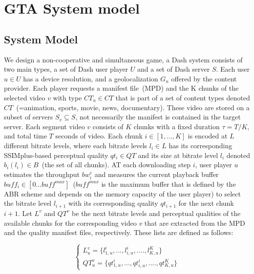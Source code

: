 \section{GTA System model}
\label{sec:gta-dash-model}

\subsection{System Model}

We design a non-cooperative and simultaneous game, a Dash system consists of two main types, a set of Dash user player $U$ and a set of Dash server $S$. Each user $u \in U$ has a device resolution, and a geolocalization $G_{u}$ offered by the content provider. Each player requests a manifest file~(MPD) and the K chunks of the selected video $v$ with type $CT_{u} \in CT$ that is part of a set of content types denoted $CT$~(={animation, sports, movie, news, documentary}). These video are stored on a subset of servers $S_{v} \subseteq S$, not necessarily the manifest is contained in the target server. Each segment video $v$ consists of $K$  chunks with a fixed duration  $\tau = T/K$, and total time $T$ seconds of video. Each chunk $i \in [1,...,K]$ is encoded at $L$ different bitrate levels, where each bitrate levels $l_{i} \in L$ has its corresponding SSIMplus-based perceptual quality $qt_{i} \in QT$ and its size at bitrate level $l_{i}$ denoted $b_{i}(l_{i}) \in B$~(the set of all chunks). AT each downloading step $i$, user player $u$ estimates the throughput $bw_{i}^{e}$ and measures the current playback buffer $buff_{i} \in [0...buff^{max}]$~($buff^{max}$ is the maximum buffer that is defined by the ABR scheme and depends on the memory capacity of the user player) to select the bitrate level $l_{i+1}$  with its corresponding quality $qt_{i+1}$ for the next chunk $i+1$. Let $L^{v}$ and $QT^{v}$  be the next bitrate levels and perceptual qualities of the available chunks for the corresponding video $v$ that are extracted from the MPD and the quality manifest files, respectively. These lists are defined as follows:

\begin{equation}\label{total_capacity_loss}
\left\{\begin{matrix}
L^{v}_{u}  = \{ l^{i}_{1,u}, ..., l^{i}_{i,u}, ...., l^{K}_{K,u} \} \\ 
QT^{v}_{u} = \{ qt^{i}_{1,u}, ..., qt^{i}_{i,u}, ...., qt^{K}_{K,u} \}
\end{matrix}\right.
\end{equation}

